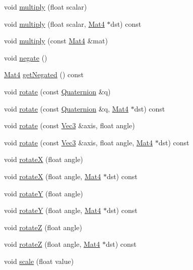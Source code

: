 \begin{DoxyCompactItemize}
\item 
void \hyperlink{classMat4_a45bc83fe1011e2c02f3d0ed9ae9081c4}{multiply} (float scalar)
\item 
void \hyperlink{classMat4_a24498dcc626d53062cb021046fa19a52}{multiply} (float scalar, \hyperlink{classMat4}{Mat4} $\ast$dst) const
\item 
void \hyperlink{classMat4_aba98567f451a133a0a3a8bad1a88ad90}{multiply} (const \hyperlink{classMat4}{Mat4} \&mat)
\item 
void \hyperlink{classMat4_a4e99a7b8e550d6a0f1e9a5d9f1305206}{negate} ()
\item 
\hyperlink{classMat4}{Mat4} \hyperlink{classMat4_ae500d08f05972355bb6213ad955091e7}{get\+Negated} () const
\item 
void \hyperlink{classMat4_a1cc6787b1cf29ce48df616a6aabe3096}{rotate} (const \hyperlink{classQuaternion}{Quaternion} \&q)
\item 
void \hyperlink{classMat4_a638b21eb95ee5240a780562e7099de4c}{rotate} (const \hyperlink{classQuaternion}{Quaternion} \&q, \hyperlink{classMat4}{Mat4} $\ast$dst) const
\item 
void \hyperlink{classMat4_a6bb112d2f8aebd87cddc46fedcd855e1}{rotate} (const \hyperlink{classVec3}{Vec3} \&axis, float angle)
\item 
void \hyperlink{classMat4_a548095c5ec16649ab859f317c5b6fec8}{rotate} (const \hyperlink{classVec3}{Vec3} \&axis, float angle, \hyperlink{classMat4}{Mat4} $\ast$dst) const
\item 
void \hyperlink{classMat4_a5e84d2bcffe8021db81c6614a88b39e5}{rotateX} (float angle)
\item 
void \hyperlink{classMat4_a8fd010ff0b011e0e2b9f97e1b83df9e5}{rotateX} (float angle, \hyperlink{classMat4}{Mat4} $\ast$dst) const
\item 
void \hyperlink{classMat4_a5c32002c4bc2d64e6933a8fe50545b51}{rotateY} (float angle)
\item 
void \hyperlink{classMat4_a0a36c4dc24d143acfb8f03d8aa1ee164}{rotateY} (float angle, \hyperlink{classMat4}{Mat4} $\ast$dst) const
\item 
void \hyperlink{classMat4_a31f8fbbe32864fef9477c4d520a4c365}{rotateZ} (float angle)
\item 
void \hyperlink{classMat4_a9320c6f0c192eed1da05f8e1dcea7a1b}{rotateZ} (float angle, \hyperlink{classMat4}{Mat4} $\ast$dst) const
\item 
void \hyperlink{classMat4_a37c910140d6378e4ef7c7bb1e2d0296d}{scale} (float value)
\item 

\end{DoxyCompactItemize}
